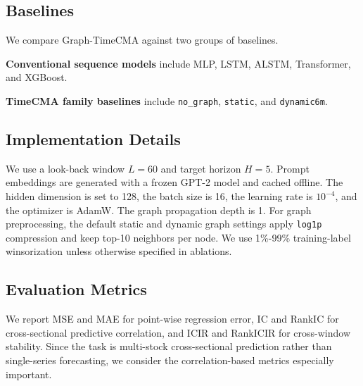 \documentclass[11pt]{article}
\begin{document}
\subsection{Baselines}

We compare Graph-TimeCMA against two groups of baselines.

\textbf{Conventional sequence models} include MLP, LSTM, ALSTM, Transformer, and XGBoost.

\textbf{TimeCMA family baselines} include \texttt{no\_graph}, \texttt{static}, and \texttt{dynamic6m}.

\subsection{Implementation Details}

We use a look-back window $L = 60$ and target horizon $H = 5$. Prompt embeddings are generated with a frozen GPT-2 model and cached offline. The hidden dimension is set to 128, the batch size is 16, the learning rate is $10^{-4}$, and the optimizer is AdamW. The graph propagation depth is 1. For graph preprocessing, the default static and dynamic graph settings apply \texttt{log1p} compression and keep top-10 neighbors per node. We use 1\%-99\% training-label winsorization unless otherwise specified in ablations.

\subsection{Evaluation Metrics}

We report MSE and MAE for point-wise regression error, IC and RankIC for cross-sectional predictive correlation, and ICIR and RankICIR for cross-window stability. Since the task is multi-stock cross-sectional prediction rather than single-series forecasting, we consider the correlation-based metrics especially important.
\end{document}
